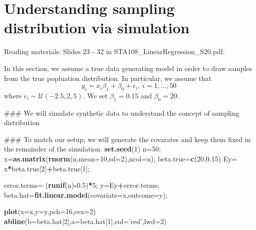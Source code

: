 \documentclass[12pt,]{book}
\newenvironment{Shaded}{\begin{snugshade}}{\end{snugshade}}
\newcommand{\KeywordTok}[1]{\textcolor[rgb]{0.13,0.29,0.53}{\textbf{#1}}}
\newcommand{\DataTypeTok}[1]{\textcolor[rgb]{0.13,0.29,0.53}{#1}}
\newcommand{\DecValTok}[1]{\textcolor[rgb]{0.00,0.00,0.81}{#1}}
\newcommand{\FloatTok}[1]{\textcolor[rgb]{0.00,0.00,0.81}{#1}}
\newcommand{\StringTok}[1]{\textcolor[rgb]{0.31,0.60,0.02}{#1}}
\newcommand{\OperatorTok}[1]{\textcolor[rgb]{0.81,0.36,0.00}{\textbf{#1}}}
\newcommand{\NormalTok}[1]{#1}
\begin{document}
\section{Understanding sampling distribution via
simulation}\label{understanding-sampling-distribution-via-simulation}

Reading materials: Slides 23 - 32 in STA108\_LinearRegression\_S20.pdf.

In this section, we assume a true data generating model in order to draw
samples from the true popluation distribution. In particular, we assume
that \[ y_i = x_i \beta_1 + \beta_0 + \epsilon_i, \ i=1,\ldots, 50\]
where \(\epsilon_i \sim {\mathcal{U}}(-2.5, 2,5)\). We set
\(\beta_1=0.15\) and \(\beta_0=20\).

\begin{Shaded}
\begin{Highlighting}[]
\NormalTok{### We will simulate synthetic data to understand the concept of sampling distribution}

\NormalTok{### To match our setup, we will generate the covarates and keep them fixed in the remainder of the simulation. }
\KeywordTok{set.seed}\NormalTok{(}\DecValTok{1}\NormalTok{)}
\NormalTok{n=}\DecValTok{50}\NormalTok{;}
\NormalTok{x=}\KeywordTok{as.matrix}\NormalTok{(}\KeywordTok{rnorm}\NormalTok{(n,}\DataTypeTok{mean=}\DecValTok{10}\NormalTok{,}\DataTypeTok{sd=}\DecValTok{2}\NormalTok{),}\DataTypeTok{ncol=}\NormalTok{n);}
\NormalTok{beta.true=}\KeywordTok{c}\NormalTok{(}\DecValTok{20}\NormalTok{,}\FloatTok{0.15}\NormalTok{)}
\NormalTok{Ey=}\StringTok{ }\NormalTok{x}\OperatorTok{*}\NormalTok{beta.true[}\DecValTok{2}\NormalTok{]}\OperatorTok{+}\NormalTok{beta.true[}\DecValTok{1}\NormalTok{];}

\NormalTok{error.terms=}\StringTok{ }\NormalTok{(}\KeywordTok{runif}\NormalTok{(n)}\OperatorTok{-}\FloatTok{0.5}\NormalTok{)}\OperatorTok{*}\DecValTok{5}\NormalTok{;}
\NormalTok{y=Ey}\OperatorTok{+}\NormalTok{error.terms;}
\NormalTok{beta.hat=}\KeywordTok{fit.linear.model}\NormalTok{(}\DataTypeTok{covariate=}\NormalTok{x,}\DataTypeTok{outcome=}\NormalTok{y);}


\KeywordTok{plot}\NormalTok{(}\DataTypeTok{x=}\NormalTok{x,}\DataTypeTok{y=}\NormalTok{y,}\DataTypeTok{pch=}\DecValTok{16}\NormalTok{,}\DataTypeTok{cex=}\DecValTok{2}\NormalTok{)}
\KeywordTok{abline}\NormalTok{(}\DataTypeTok{b=}\NormalTok{beta.hat[}\DecValTok{2}\NormalTok{],}\DataTypeTok{a=}\NormalTok{beta.hat[}\DecValTok{1}\NormalTok{],}\DataTypeTok{col=}\StringTok{'red'}\NormalTok{,}\DataTypeTok{lwd=}\DecValTok{2}\NormalTok{)}
\end{Highlighting}
\end{Shaded}
\end{document}
